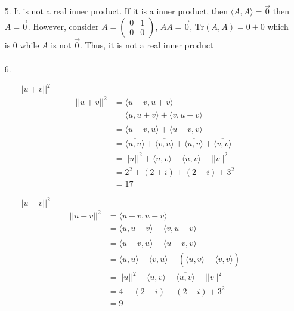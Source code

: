 \documentclass{article}
\begin{document}
\begin{itemize}
\begin{itemize}
    \end{itemize}
    \item[5.] It is not a real inner product. If it is a inner product, then \(\langle A,A\rangle = \overrightarrow{0}\) then \(A=\overrightarrow{0}\). However, consider \(
    A = \begin{pmatrix}
        0&1\\
        0&0
    \end{pmatrix}
    \), 
    \(AA = \overrightarrow{0}\), \(\text{Tr}(A,A)= 0+0\) which is 0 while \(A\) is not \(\overrightarrow{0}\). Thus, it is not a real inner product 
        \begin{align*}
        \end{align*}
    \item [6.]\
    \begin{itemize}
        \item [\(||u+v||^2\)]
        \begin{align*}
            ||u+v||^2&= \langle u+v,u+v\rangle\\
            &=\langle u,u+v\rangle+\langle v,u+v\rangle\\
            &=\overline{\langle u+v,u \rangle}+\overline{\langle u+v,v \rangle}\\
            &=\overline{\langle u,u \rangle}+\overline{\langle v,u \rangle}+\overline{\langle u,v \rangle}+\overline{\langle v,v \rangle}\\
            &=||u||^2+\langle u,v \rangle +\overline{\langle u,v \rangle}+ ||v||^2\\
            &=2^2 + (2+i)+(2-i)+3^2\\
            &=17
        \end{align*}
        \item [\(||u-v||^2\)]
        \begin{align*}
            ||u-v||^2&= \langle u-v,u-v\rangle\\
            &=\langle u,u-v\rangle-\langle v,u-v\rangle\\
            &=\overline{\langle u-v,u\rangle}-\overline{\langle u-v,v\rangle}\\
            &=\overline{\langle u,u\rangle}-\overline{\langle v,u\rangle}-\left(\overline{\langle u,v\rangle}-\overline{\langle v,v\rangle}\right)\\
            &=||u||^2-\langle u,v \rangle - \overline{\langle u,v\rangle}+ ||v||^2\\
            &=4-(2+i)-(2-i)+3^2\\
            &=9

\end{align*}
\end{itemize}
\end{itemize}
\end{document}
